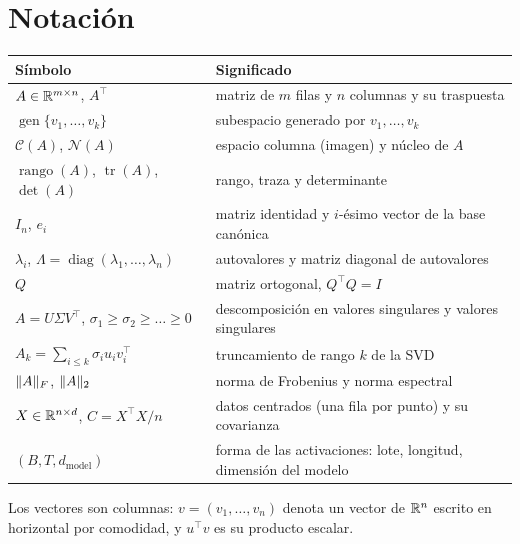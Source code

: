\documentclass[11pt,a4paper,twoside,openany]{book}
\DeclareMathOperator{\rango}{rango}
\DeclareMathOperator{\traza}{tr}
\DeclareMathOperator{\gen}{gen}
\DeclareMathOperator{\diag}{diag}
\newcommand{\Col}{\mathcal{C}}
\newcommand{\Nuc}{\mathcal{N}}
\newcommand{\T}{^{\top}}
\newcommand{\dmodel}{d_{\mathrm{model}}}
\begin{document}
\section*{Notación}
\begin{center}
\small
\begin{tabular}{@{}ll@{}}
\toprule
Símbolo & Significado \\
\midrule
$A\in\mathbb{R}^{m\times n}$, $A\T$ & matriz de $m$ filas y $n$ columnas y su traspuesta \\
$\gen\{v_1,\dots,v_k\}$ & subespacio generado por $v_1,\dots,v_k$ \\
$\Col(A)$, $\Nuc(A)$ & espacio columna (imagen) y núcleo de $A$ \\
$\rango(A)$, $\traza(A)$, $\det(A)$ & rango, traza y determinante \\
$I_n$, $e_i$ & matriz identidad y $i$-ésimo vector de la base canónica \\
$\lambda_i$, $\Lambda=\diag(\lambda_1,\dots,\lambda_n)$ & autovalores y matriz diagonal de autovalores \\
$Q$ & matriz ortogonal, $Q\T Q=I$ \\
$A=U\Sigma V\T$, $\sigma_1\ge\sigma_2\ge\dots\ge 0$ & descomposición en valores singulares y valores singulares \\
$A_k=\sum_{i\le k}\sigma_i u_iv_i\T$ & truncamiento de rango $k$ de la SVD \\
$\lVert A\rVert_F$, $\lVert A\rVert_2$ & norma de Frobenius y norma espectral \\
$X\in\mathbb{R}^{n\times d}$, $C=X\T X/n$ & datos centrados (una fila por punto) y su covarianza \\
$(B,T,\dmodel)$ & forma de las activaciones: lote, longitud, dimensión del modelo \\
\bottomrule
\end{tabular}
\end{center}

Los vectores son columnas: $v=(v_1,\dots,v_n)$ denota un vector de $\mathbb{R}^{n}$ escrito en horizontal por comodidad, y $u\T v$ es su producto escalar.


\tableofcontents

\mainmatter







\backmatter

\end{document}
